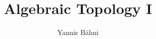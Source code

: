 

\title{Algebraic Topology I}
\author{Yannis B\"{a}hni}
\address[Yannis B\"{a}hni]{University of Zurich, R\"{a}mistrasse 71, 8006 Zurich}


\maketitle

\tableofcontents






